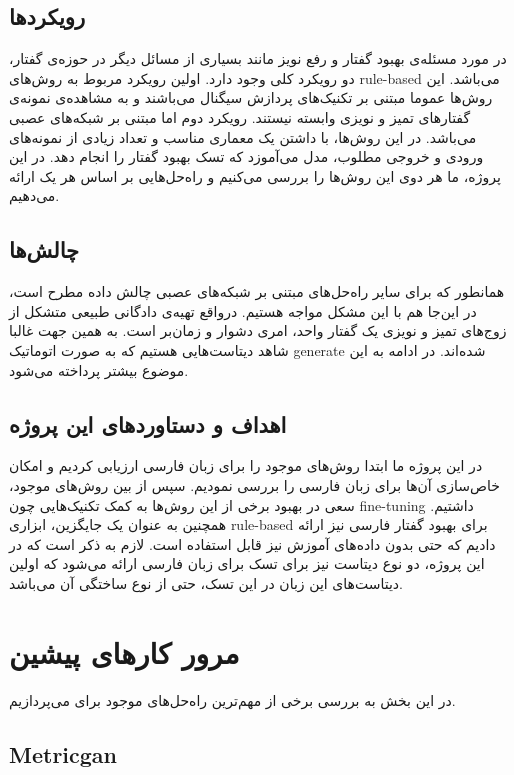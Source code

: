 \documentclass[fleqn]{report}
\begin{document}
\section{رویکردها}
در مورد مسئله‌ی بهبود گفتار و رفع نویز مانند بسیاری از مسائل دیگر در حوزه‌ی گفتار، دو رویکرد کلی وجود دارد.
اولین رویکرد مربوط به روش‌های 
rule-based می‌باشد.
این روش‌ها عموما مبتنی بر تکنیک‌های پردازش سیگنال می‌باشند و به مشاهده‌ی نمونه‌ی گفتار‌های تمیز و نویزی وابسته نیستند.
رویکرد دوم اما
مبتنی بر شبکه‌های 
عصبی می‌باشد.
در این روش‌ها، با داشتن یک معماری مناسب و تعداد زیادی از نمونه‌های ورودی و خروجی مطلوب، مدل می‌آموزد که تسک بهبود گفتار را انجام دهد.
در این پروژه، ما هر دوی این روش‌ها را بررسی می‌کنیم و راه‌حل‌هایی بر اساس هر یک ارائه می‌دهیم.

\section{چالش‌ها}
همانطور که برای سایر راه‌حل‌های مبتنی بر شبکه‌های عصبی  
چالش داده مطرح است، در این‌جا هم با این مشکل مواجه هستیم.
درواقع تهیه‌ی دادگانی طبیعی متشکل از زوج‌های تمیز و نویزی یک گفتار واحد، امری دشوار و زمان‌بر است. 
به همین جهت غالبا شاهد دیتاست‌هایی هستیم که به صورت اتوماتیک generate شده‌اند.
در ادامه به این موضوع بیشتر پرداخته می‌شود.

\section{اهداف و دستاورد‌های این پروژه}
در این پروژه ما ابتدا روش‌های موجود را برای زبان فارسی ارزیابی کردیم و امکان خاص‌سازی آن‌ها برای زبان فارسی را بررسی نمودیم.
سپس از بین روش‌های موجود، سعی در بهبود برخی از این روش‌ها به کمک تکنیک‌هایی چون fine-tuning داشتیم.
همچنین به عنوان یک جایگزین، ابزاری rule-based برای بهبود گفتار فارسی نیز ارائه دادیم که حتی بدون داده‌های آموزش نیز قابل استفاده است.
لازم به ذکر است که در این پروژه، دو نوع دیتاست نیز برای تسک  برای زبان فارسی ارائه می‌شود که  اولین دیتاست‌های این زبان در این تسک،‌ حتی از نوع ساختگی آن می‌باشد.

\chapter{مرور کارهای پیشین}
در این بخش به بررسی برخی از مهم‌ترین راه‌حل‌های موجود برای  می‌پردازیم.

\section{Metricgan}
\end{document}
